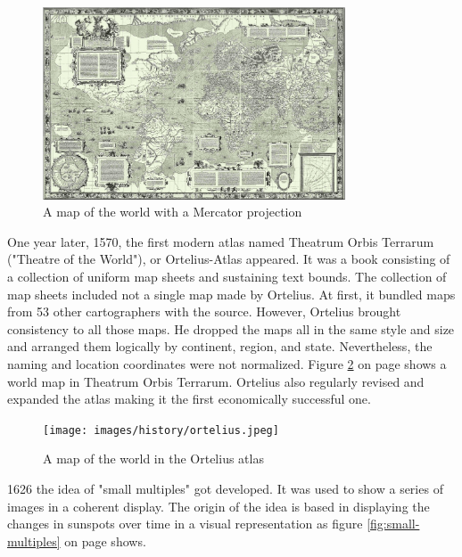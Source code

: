 \begin{figure}[!htb]
\centering
\includegraphics[width=0.8\textwidth,keepaspectratio]{images/history/mercator.png}
\caption[
    A map of the world with a Mercator projection, Urldate: 07.2016 \newline
\small\texttt{\url{https://upload.wikimedia.org/wikipedia/commons/b/b2/Mercator_1569.png}}
]{A map of the world with a Mercator projection}
\label{fig:mercator}
\end{figure}

One year later, 1570, the first modern atlas named Theatrum Orbis Terrarum ("Theatre of the World"), or Ortelius-Atlas appeared. It was a book consisting of a collection of uniform map sheets and sustaining text bounds. The collection of map sheets included not a single map made by Ortelius. At first, it bundled maps from 53 other cartographers with the source. However, Ortelius brought consistency to all those maps. He dropped the maps all in the same style and size and arranged them logically by continent, region, and state. Nevertheless, the naming and location coordinates were not normalized. Figure \ref{fig:ortelius} on page \pageref{fig:ortelius} shows a world map in Theatrum Orbis Terrarum. Ortelius also regularly revised and expanded the atlas making it the first economically successful one.

\begin{figure}[!htb]
\centering
\texttt{[image: images/history/ortelius.jpeg]}
\caption[
    A map of the world in the Ortelius atlas, Urldate: 07.2016 \newline
\small\texttt{\url{https://upload.wikimedia.org/wikipedia/commons/6/6f/OrteliusWorldMap.jpeg}}
]{A map of the world in the Ortelius atlas}
\label{fig:ortelius}
\end{figure}

1626 the idea of "small multiples" got developed. It was used to show a series of images in a coherent display. The origin of the idea is based in displaying the changes in sunspots over time in a visual representation as figure \ref{fig:small-multiples} on page \pageref{fig:small-multiples} shows.

